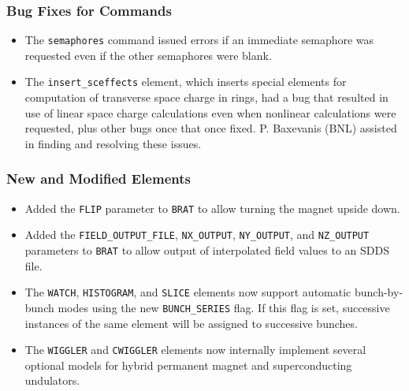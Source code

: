 \documentclass[11pt]{article}
\begin{document}
\subsubsection{Bug Fixes for Commands}
\begin{itemize}
\item The \verb|semaphores| command issued errors if an immediate semaphore was requested even if the
  other semaphores were blank.
\item The \verb|insert_sceffects| element, which inserts special elements for computation of transverse space charge in rings,
  had a bug that resulted in use of linear space charge calculations even when nonlinear calculations were requested,
  plus other bugs once that once fixed. P. Baxevanis (BNL) assisted in finding and resolving these issues.
\end{itemize}

\subsubsection{New and Modified Elements}
\begin{itemize}
\item Added the \verb|FLIP| parameter to \verb|BRAT| to allow turning the magnet upside down.
\item Added the \verb|FIELD_OUTPUT_FILE|, \verb|NX_OUTPUT|, \verb|NY_OUTPUT|, and \verb|NZ_OUTPUT|
  parameters to \verb|BRAT| to allow output of interpolated field values to an SDDS file.
\item The \verb|WATCH|, \verb|HISTOGRAM|, and \verb|SLICE| elements now support automatic bunch-by-bunch
  modes using the new \verb|BUNCH_SERIES| flag. If this flag is set, successive instances of the same element
  will be assigned to successive bunches.
\item The \verb|WIGGLER| and \verb|CWIGGLER| elements now internally implement several optional models for hybrid permanent magnet
  and superconducting undulators.
\end{itemize}
\end{document}
